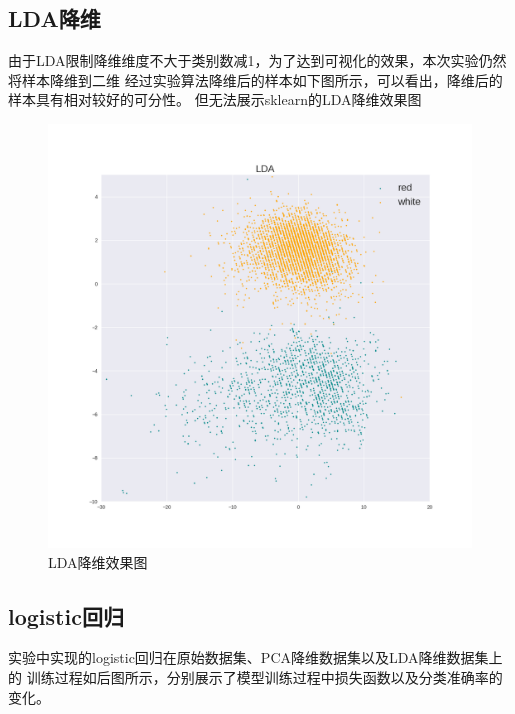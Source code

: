 \documentclass[notitlepage]{article}
\begin{document}
\subsection*{LDA降维}

由于LDA限制降维维度不大于类别数减1，为了达到可视化的效果，本次实验仍然将样本降维到二维
经过实验算法降维后的样本如下图所示，可以看出，降维后的样本具有相对较好的可分性。
但无法展示sklearn的LDA降维效果图

\begin{figure}[h]
	\centering\includegraphics[width=.4\columnwidth]
    {../imgs/mine/lda_data.png}
	\caption{LDA降维效果图}
\end{figure}

\subsection{logistic回归}

实验中实现的logistic回归在原始数据集、PCA降维数据集以及LDA降维数据集上的
训练过程如后图所示，分别展示了模型训练过程中损失函数以及分类准确率的变化。
\end{document}
